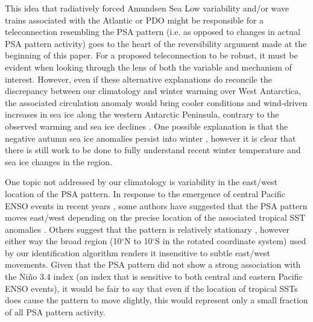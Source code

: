 This idea that radiatively forced Amundsen Sea Low variability and/or wave trains associated with the Atlantic or PDO might be responsible for a teleconnection resembling the PSA pattern (i.e. as opposed to changes in actual PSA pattern activity) goes to the heart of the reversibility argument made at the beginning of this paper. For a proposed teleconnection to be robust, it must be evident when looking through the lens of both the variable and mechanism of interest. However, even if these alternative explanations do reconcile the discrepancy between our climatology and winter warming over West Antarctica, the associated circulation anomaly would bring cooler conditions and wind-driven increases in sea ice along the western Antarctic Peninsula, contrary to the observed warming and sea ice declines \citep{Clem2015}. One possible explanation is that the negative autumn sea ice anomalies persist into winter \citep{Ding2013}, however it is clear that there is still work to be done to fully understand recent winter temperature and sea ice changes in the region.

One topic not addressed by our climatology is variability in the east/west location of the PSA pattern. In response to the emergence of central Pacific ENSO events in recent years \citep[e.g.][]{Ashok2007}, some authors have suggested that the PSA pattern moves east/west depending on the precise location of the associated tropical SST anomalies \citep[e.g.][]{Sun2013,Wilson2014,Ciasto2015}. Others suggest that the pattern is relatively stationary \citep[e.g.][]{Liu2007,Ding2012}, however either way the broad region (10$^{\circ}$N to 10$^{\circ}$S in the rotated coordinate system) used by our identification algorithm renders it insensitive to subtle east/west movements. Given that the PSA pattern did not show a strong association with the Ni\~{n}o 3.4 index (an index that is sensitive to both central and eastern Pacific ENSO events), it would be fair to say that even if the location of tropical SSTs does cause the pattern to move slightly, this would represent only a small fraction of all PSA pattern activity. 

